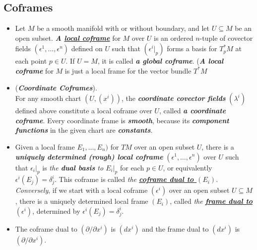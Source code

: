 \documentclass[11pt]{article}
\begin{document}
\subsection{Coframes}
\begin{itemize}
\item \begin{definition}
Let $M$ be a smooth manifold with or without boundary, and let $U \subseteq M$ be an open subset. \emph{\textbf{A \underline{local coframe}}} for $M$ over $U$ is an ordered $n$-tuple of covector fields $(\epsilon^1, \ldots, \epsilon^n)$ defined on $U$ such that $(\epsilon^{i}|_{p})$ forms a basis for $T_{p}^{*}M$ at each point $p \in U$. If $U = M$, it is called \emph{\textbf{a global coframe}}. (\emph{\textbf{A local coframe}} for $M$ is just a local frame for the vector bundle $T^{*}M$
\end{definition}

\item \begin{example} (\emph{\textbf{Coordinate Coframes}}). \\
For any smooth chart $(U, (x^i))$, the \emph{\textbf{coordinate covector fields}} $(\lambda^i)$ defined above constitute a local coframe over $U$, called \emph{\textbf{a coordinate coframe}}. Every coordinate frame is \emph{\textbf{smooth}}, because its \emph{\textbf{component functions}} in the given chart are \emph{\textbf{constants}}.
\end{example}

\item \begin{definition}
Given a local frame $E_1,\ldots,E_n)$ for $TM$ over an open subset $U$, there is a \emph{\textbf{uniquely determined (rough) local coframe}} $(\epsilon^1, \ldots, \epsilon^n)$ over $U$ such that $\epsilon_i|_{p}$ is \emph{the \textbf{dual basis} to $E_i|_{p}$} for each $p \in U$, or equivalently $\epsilon^i(E_{j}) = \delta_{j}^{i}$. This coframe
is called \emph{the \underline{\textbf{coframe dual to $(E_i)$}}}. \emph{Conversely}, if we start with a local coframe $(\epsilon^{i})$ over an open subset $U \subseteq M$, there is a uniquely determined local frame $(E_i)$, called \emph{the \underline{\textbf{frame dual to  $(\epsilon^{i})$}}}, determined by $\epsilon^i(E_{j}) = \delta_{j}^{i}$. 
\end{definition}

\item \begin{remark}
The coframe dual to $(\partial / \partial x^i)$ is $(dx^{i})$ and the frame dual to $(dx^{i})$ is $(\partial / \partial x^i)$.
\end{remark}


\end{itemize}
\end{document}
